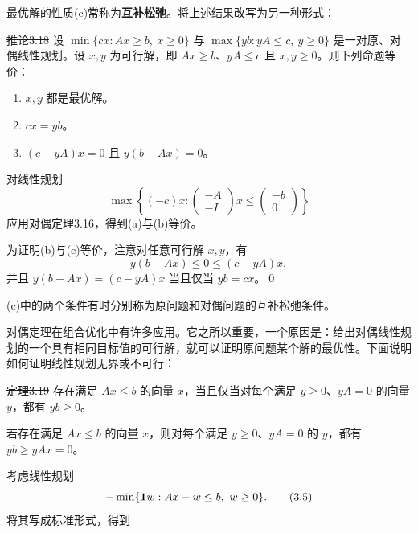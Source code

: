 最优解的性质(c)常称为\textbf{互补松弛}。将上述结果改写为另一种形式：

\st{推论3.18} 设 $\min\{cx:Ax\ge b,\ x\ge0\}$ 与 $\max\{yb:yA\le c,\ y\ge0\}$ 是一对原、对偶线性规划。设 $x,y$ 为可行解，即 $Ax\ge b$、$yA\le c$ 且 $x,y\ge0$。则下列命题等价：
\begin{enumerate}[label=(\alph*)]
\item $x,y$ 都是最优解。
\item $cx=yb$。
\item $(c-yA)x=0$ 且 $y(b-Ax)=0$。
\end{enumerate}
\pr 对线性规划
\[
\max\left\{(-c)x:\begin{pmatrix}-A\\-I\end{pmatrix}x
\le\begin{pmatrix}-b\\0\end{pmatrix}\right\}
\]
应用对偶定理3.16，得到(a)与(b)等价。

为证明(b)与(c)等价，注意对任意可行解 $x,y$，有
\[
y(b-Ax)\le0\le(c-yA)x,
\]
并且 $y(b-Ax)=(c-yA)x$ 当且仅当 $yb=cx$。\qed

(c)中的两个条件有时分别称为原问题和对偶问题的互补松弛条件。

对偶定理在组合优化中有许多应用。它之所以重要，一个原因是：给出对偶线性规划的一个具有相同目标值的可行解，就可以证明原问题某个解的最优性。下面说明如何证明线性规划无界或不可行：

\st{定理3.19} 存在满足 $Ax\le b$ 的向量 $x$，当且仅当对每个满足 $y\ge0$、$yA=0$ 的向量 $y$，都有 $yb\ge0$。

\pr 若存在满足 $Ax\le b$ 的向量 $x$，则对每个满足 $y\ge0$、$yA=0$ 的 $y$，都有 $yb\ge yAx=0$。

考虑线性规划
\begin{equation}
-\min\{\one w:Ax-w\le b,\ w\ge0\}.\tag{3.5}
\end{equation}
将其写成标准形式，得到

